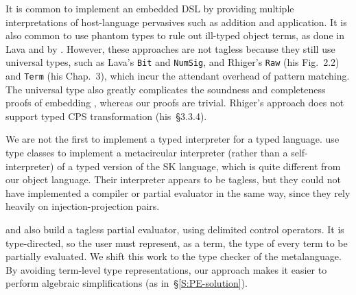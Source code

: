 It is common to implement an embedded DSL by providing multiple
interpretations of host\hyp language pervasives such as addition and
application.  It is also common to use phantom types to rule out
ill-typed object terms, as done in Lava
\citep{Lava} and by \citet{Rhiger-thesis}. However, these approaches
are not tagless because they still use universal types, such as Lava's
\texttt{Bit} and \texttt{NumSig}, and Rhiger's \texttt{Raw} (his Fig.~2.2)
and \texttt{Term} (his Chap.~3), which incur the attendant overhead of
pattern matching.  The universal type also
greatly complicates the soundness and completeness proofs of embedding
\citep{Rhiger-thesis}, whereas our proofs are trivial.
Rhiger's approach does not support typed CPS transformation (his~\S3.3.4).
\begin{comment}
Rhiger's But Fig 2.2, p33: universal type Raw.  He uses phantom type
upon the Exp datatype. But that is cheating: phantom type means
essentially we can easily do coerce. We use real types.  That's why he
had to do tedious proofs in Sec 2 of soundness and completeness of
embedding. Whereas our proofs are obvious.  His sec 3 is based on data
representation of terms. They have type tags.  We do nothing of that
kind: See Sec 3.1.2. See numerous "data Term" in Sec3, which is the U
type.  In Sec 3.3.4 (p76) Rhiger specifically says that his encoding
cannot do typed CPS transformation -- whereas our does. BTW, Rhiger
thesis contains the definitions of the interpreter and the compiler,
in the beginning. Use this in response to Rev1)
\end{comment}


We are not the first to implement a typed interpreter for a typed
language.   use type classes to implement a metacircular
interpreter (rather than a self\hyp interpreter) of a
typed version of the SK language, which is quite different from our
object language.  Their interpreter
appears to be tagless, but they could not have implemented a
compiler or partial evaluator in the same way, since they rely
heavily on injection\hyp projection pairs.

 and \citet{balat:tdpe-popl2004} also build
a tagless partial evaluator, using delimited control operators.  It is
type-directed, so the user must represent, as a term, the type of every
term to be partially evaluated.  We shift this work to the type checker
of the metalanguage.  By avoiding term-level type representations, our
approach makes it easier to perform algebraic simplifications (as
in~\S\ref{S:PE-solution}).

